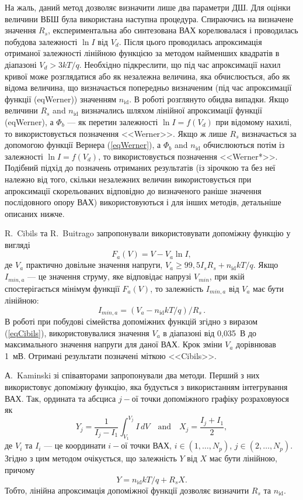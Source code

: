\documentclass[a4paper,14pt,oneside,openany]{memoir}
\begin{document}
На жаль, даний метод дозволяє визначити лише два параметри ДШ.
Для оцінки величини ВБШ була використана наступна процедура.
Спираючись на визначене значення $R_s$, експериментальна або синтезована ВАХ корелювалася і проводилась побудова залежності  $\ln I$ від $V_d$.
Після цього проводилась апроксимація отриманої залежності лінійною функцією за методом найменших квадратів в діапазоні $V_d>3kT/q$.
Необхідно підкреслити, що під час апроксимації нахил кривої може розглядатися або як незалежна величина, яка обчислюється, або як відома величина, що визначається попередньо визначеним (під час апроксимації функції (eqWerner)) значенням $n_\mathrm{id}$.
В роботі розглянуто обидва випадки.
Якщо величини $R_s$ and $n_\mathrm{id}$ визначались шляхом лінійної апроксимації функції (eqWerner), а $\Phi_b$ --- як перетин залежності $\ln I=f(V_d)$ при відомому нахилі, то використовується позначення <<Werner>>.
Якщо ж лише $R_s$ визначається за допомогою функції Вернера (\ref{eqWerner}), а $\Phi_b$ and $n_\mathrm{id}$ обчислюються потім із залежності $\ln I=f(V_d)$, то використовується позначення <<Werner*>>.
Подібний підхід до позначень отриманих результатів (із зірочкою та без неї належно від того, скільки незалежних величин використовується при апроксимації скорельованих відповідно до визначеного раніше значення послідовного опору ВАХ) використовуються і для інших методів, детальніше описаних нижче.

R.~Cibils  та R.~Buitrago \cite{Cibils} запропонували використовувати допоміжну функцію у вигляді
\begin{equation}
\label{eqCibils}
F_a(V)=V-V_a\ln I,
\end{equation}
де
$V_a$ практично довільне значення напруги, $V_a\geq99,5I_sR_s+n_\mathrm{id}kT/q$.
Якщо $I_{min,a}$ --- це значення струму, яке відповідає напрузі $V_{min}$, при якій спостерігається мінімум функції $F_a(V)$,
то залежність $I_{min,a}$ від $V_a$ має бути \cite{Cibils} лінійною:
\begin{equation}
\label{eqCibilsDet}
I_{min,a}=(V_a-n_\mathrm{id}kT/q)/R_s\,.
\end{equation}
В роботі при побудові сімейства допоміжних функцій згідно з виразом (\ref{eqCibils}), використовувалися значення  $V_a$ в діапазоні від 0,035~В до максимального значення напруги для даної ВАХ.
Крок зміни $V_a$ дорівнював 1~мВ.
Отримані результати позначені міткою <<Cibils>>.

А.~Kaminski зі співавторами \cite{Kaminski} запропонували два методи.
Перший з них використовує допоміжну функцію, яка будується з використанням інтегрування ВАХ.
Так, ордината та абсциса $j-$ої точки допоміжного графіку розраховуюся як
\begin{equation}
\label{eqKam1}
Y_j=\frac{1}{I_j-I_1}\int_{V_1}^{V_j}I\,dV \quad\text{and}\quad X_j=\frac{I_j+I_1}{2},
\end{equation}
де
$V_i$ та $I_i$ --- це координати $i-$ої точки ВАХ,
$i\in(1,\ldots, N_p)$,
$j\in(2,\ldots, N_p)$.
Згідно з цим методом очікується, що залежність $Y$ від $X$ має бути лінійною, причому
\begin{equation}
\label{eqKam1Det}
Y=n_\mathrm{id}kT/q+R_sX.
\end{equation}
Тобто, лінійна апроксимація допоміжної функції дозволяє визначити $R_s$ та $n_\mathrm{id}$.
\end{document}
